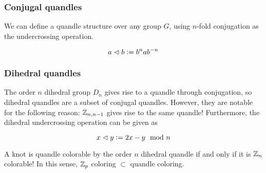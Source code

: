 \documentclass[paper.tex]{subfiles}
\begin{document}
\subsubsection{Conjugal quandles}
\label{sec:conjugal}

We can define a quandle structure over any group $G$, using $n$-fold conjugation as the undercrossing operation.

\begin{equation}
  a \vartriangleleft b \vcentcolon= b^n a b^{-n}
\end{equation}

\subsubsection{Dihedral quandles}
\label{sec:dihedral}

The order $n$ dihedral group $D_n$ gives rise to a quandle through conjugation, so dihedral quandles are a subset of conjugal quandles. However, they are notable for the following reason:
$\mathbb{Z}_{n, n - 1}$ gives rise to the same quandle! Furthermore, the dihedral undercrossing operation can be given as

$$x\vartriangleleft y \vcentcolon= 2x - y \mod n$$

A knot is quandle colorable by the order $n$ dihedral quandle if and only if it is $\mathbb{Z}_n$ colorable! In this sense, $\mathbb{Z}_p$ coloring $\subset$ quandle coloring.
\end{document}

